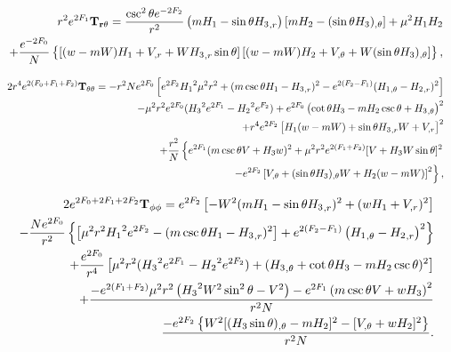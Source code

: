 \begin{eqnarray}
&&  r^2e^{2F_1}{\bf T_{r\theta}}= \frac{ \csc ^2\theta e^{-2 {F_2}}}{r^2} \left({m} {H_1}-\sin \theta {H_3}_{,r}\right) 
 \left[{m} {H_2}-(\sin\theta 
{H_3})_{,\theta}\right] +{\mu^2}  {H_1} 
{H_2}
 \nonumber \\
%
&&
+\frac{e^{-2 {F_0}}}{N} \left\{[ (w-{m}W) {H_1}+V_{,r}+ W{H_3}_{,r}\sin\theta ] \left[(w-{m}W) {H_2}+V_{,\theta}+W
(\sin\theta{H_3})_{,\theta}\right]
\right\},
\end{eqnarray}









\begin{eqnarray}
&& 2r^4e^{2(F_0+F_1+F_2)}{\bf T_{\theta\theta}}=-r^2 N e^{2 {F_0}} \left[e^{2 F_2} {H_1}^2 
{\mu^2} r^2 +( m\csc\theta H_1-{H_3}_{,r})^2  -e^{2( {F_2}-F_1)}( {H_1}_{,\theta}- 
{H_2}_{,r})^2\right] \nonumber \\
%
&&
-{\mu^2} r^2e^{2 {F_0}}({H_3}^2 e^{2 {F_1}}-{H_2}^2e^{F_2})
+e^{2 {F_0}} \left(\cot \theta {H_3}-m{H_2} \csc\theta+ {H_3}_{,\theta}\right)^2
 \nonumber \\
%
&&
+ r^4 e^{2 {F_2}} \left[
 {H_1} (w-{m} W)+ \sin\theta  {H_3}_{,r} W+
V_{,r} \right]^2 \nonumber \\
&&
%
+\frac{r^2}{N} \left\{e^{2 {F_1}}({m} \csc\theta 
 V+{H_3}w)^2 +{\mu^2} r^2e^{2 ({F_1}+F_2)}[V+ {H_3} W \sin\theta]^2 
 \right. \nonumber \\
%
&&
\left.
-e^{2 {F_2}}\left[
V_{,\theta}+ (\sin\theta  
{H_3})_{,\theta} W+ 
{H_2} (w-{m} W)\right]^2\right\},
\end{eqnarray}










 \begin{eqnarray}
&& 2e^{2F_0+2F_1+2F_2}{\bf T_{\phi\phi}}=e^{2F_2}\left[ -W^2(m{H_1}  
- \sin\theta  
{H_3}_{,r} )^2
+(wH_1+V_{,r})^2\right] \nonumber \\
% 
&&
-\frac{N e^{2 {F_0}}}{r^2} \left\{\left[ {\mu^2} r^2 {H_1}^2 e^{2 {F_2}}
-({m} \csc \theta  {H_1}
-{H_3}_{,r})^2\right] +e^{2(
{F_2}-F_1)}\left( {H_1}_{,\theta}- 
{H_2}_{,r}\right)^2\right\}
\nonumber \\
%
&&
+ \frac{e^{2 F_0}}{r^4} \left[{\mu^2} 
r^2( {H_3}^2 e^{2 {F_1}}- {H_2}^2 e^{2
{F_2}}) + ({H_3}_{,\theta}+ \cot
\theta  {H_3}-mH_2\csc\theta)^2\right]  \nonumber \\
%
%
&&
+\frac{- e^{2 (F_1+{F_2})} {\mu^2} r^2\left({H_3}^2  W^2 \sin ^2\theta  - V^2\right) -e^{2 {F_1}}\left(
{m} \csc\theta 
 V +w{H_3}  \right)^2}{r^2N} \nonumber \\
 && \frac{-e^{2 {F_2}}\left\{W^2[(H_3\sin\theta)_{,\theta}-mH_2]^2-[V_{,\theta}+wH_2]^2\right\}}{r^2N} .
\nonumber \\
 && 
\end{eqnarray}  



